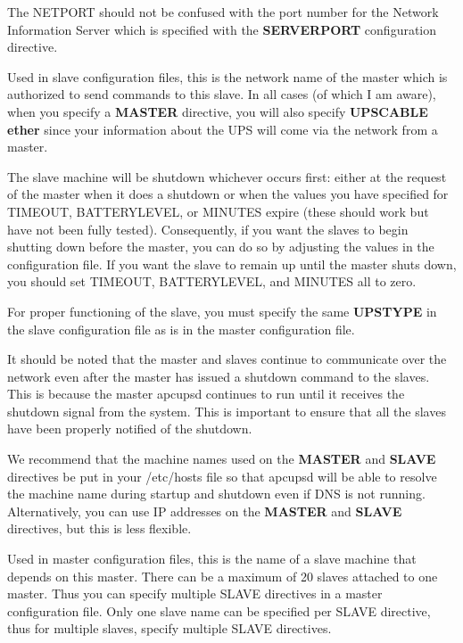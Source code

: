 {{{{{{{{{{\begin{description}
{The NETPORT should not be confused with the port number for the Network
Information Server which is specified with the {\bf SERVERPORT} configuration
directive.  

\item [MASTER \lt{}name of the master\gt{} for slave machines.]
   Used in slave configuration files, this is the network name of the master
which is authorized to send commands to this slave. In all cases (of which I
am aware), when you specify a {\bf MASTER} directive, you will also specify
{\bf UPSCABLE ether} since your information about the UPS will come via the
network from a master.  

The slave machine will be shutdown whichever occurs first: either at the
request of the master when it does a shutdown or when the values you have
specified for TIMEOUT, BATTERYLEVEL, or MINUTES expire (these should work but
have not been fully tested). Consequently, if you want the slaves to begin
shutting down before the master, you can do so by adjusting the values in the
configuration file. If you want the slave to remain up until the master shuts
down, you should set TIMEOUT, BATTERYLEVEL, and MINUTES all to zero.  

For proper functioning of the slave, you must specify the same {\bf UPSTYPE}
in the slave configuration file as is in the master configuration file.  

It should be noted that the master and slaves continue to communicate over the
network even after the master has issued a shutdown command to the slaves.
This is because the master apcupsd continues to run until it receives the
shutdown signal from the system. This is important to ensure that all the
slaves have been properly notified of the shutdown.  

We recommend that the machine names used on the {\bf MASTER} and {\bf SLAVE}
directives be put in your /etc/hosts file so that apcupsd will be able to
resolve the machine name during startup and shutdown even if DNS is not
running. Alternatively, you can use IP addresses on the {\bf MASTER} and {\bf
SLAVE} directives, but this is less flexible.  

\item [SLAVE \lt{}name of slave(s)\gt{} used only in MASTER configuration
   files.]
Used in master configuration files, this is the name of a slave machine that
depends on this master. There can be a maximum of 20 slaves attached to one
master. Thus you can specify multiple SLAVE directives in a master
configuration file. Only one slave name can be specified per SLAVE directive,
thus for multiple slaves, specify multiple SLAVE directives.  

}
\end{description}}}}}}}}}}}
